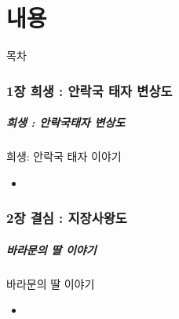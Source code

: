 \documentclass[aspectratio=1610,12pt,xcolor=pdftex,dvipsnames,table,handout]{beamer}
\begin{document}
		

		\part{ 내용 }
		\frame{\partpage}
		
		\begin{frame} [plain]{목차}
		\tableofcontents%
		\end{frame}
		

%
	\section{	1장	희생	:	안락국 태자 변상도		}
	\frame [plain] {\sectionpage}

		\begin{frame} [t,plain]
		\frametitle{ 희생 : 안락국태자 변상도  }
			\begin{block} { 희생: 안락국 태자 이야기  }
			\setlength{\leftmargini}{2em}			
			\begin{itemize}
				\item 
			\end{itemize}
			\end{block}						
								
		\end{frame}						


%
	\section{	2장	결심	:	지장사왕도		}
	\frame [plain] {\sectionpage}

		\begin{frame} [t,plain]
		\frametitle{ 바라문의 딸 이야기 }
			\begin{block} { 바라문의 딸 이야기 }
			\setlength{\leftmargini}{2em}			
			\begin{itemize}
				\item 
			\end{itemize}
			\end{block}						
								
		\end{frame}						
\end{document}
